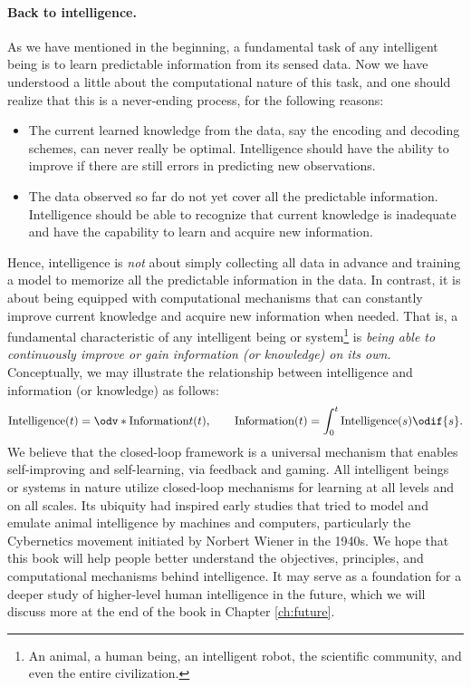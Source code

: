 \documentclass[../../book-main.tex]{subfiles}
\begin{document}
\paragraph{Back to intelligence.}
As we have mentioned in the beginning, a fundamental task of any intelligent being is to learn predictable information from its sensed data. Now we have understood a little about the computational nature of this task, and one should realize that this is a never-ending process, for the following reasons:
\begin{itemize}
    \item The current learned knowledge from the data, say the encoding and decoding schemes, can never really be optimal. Intelligence should have the ability to improve if there are still errors in predicting new observations. 
    \item The data observed so far do not yet cover all the predictable information. Intelligence should be able to recognize that current knowledge is inadequate and have the capability to learn and acquire new information.
\end{itemize}

Hence, intelligence is {\em not} about simply collecting all data in advance and training a model to memorize all the predictable information in the data. In contrast, it is about being equipped with computational mechanisms that can constantly improve current knowledge and acquire new information when needed. That is, a fundamental characteristic of any intelligent being or system\footnote{An animal, a human being, an intelligent robot, the scientific community, and even the entire civilization.} is {\em being able to continuously improve or gain information (or knowledge) on its own}. Conceptually, we may illustrate the relationship between intelligence and information (or knowledge) as follows:
\begin{equation}
\operatorname{Intelligence}(t) = \odv*{\operatorname{Information}}{t}(t), \qquad 
\operatorname{Information}(t)  = \int_0^t \operatorname{Intelligence}(s) \odif{s}.
\end{equation}
We believe that the closed-loop framework is a universal mechanism that enables self-improving and self-learning, via feedback and gaming. All intelligent beings or systems in nature utilize closed-loop mechanisms for learning at all levels and on all scales. Its ubiquity had inspired early studies that tried to model and emulate animal intelligence by machines and computers, particularly the Cybernetics movement initiated by Norbert Wiener in the 1940s. We hope that this book will help people better understand the objectives, principles, and computational mechanisms behind intelligence. It may serve as a foundation for a deeper study of higher-level human intelligence in the future, which we will discuss more at the end of the book in Chapter \ref{ch:future}.
\end{document}
